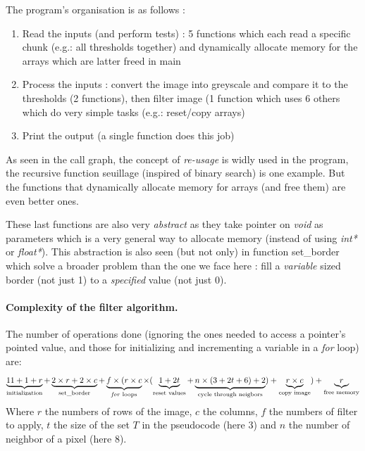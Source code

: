 \documentclass[a4paper]{report} %
\begin{document}
\SetEndCharOfAlgoLine{}

The program's organisation is as follows :
\begin{enumerate}
\item Read the inputs (and perform tests) : 5 functions which each read a specific chunk (e.g.: all thresholds together) and dynamically allocate memory for the arrays which are latter freed in main

\item Process the inputs : convert the image into greyscale and compare it to the thresholds (2 functions), then filter image
(1 function which uses 6 others which do very simple tasks (e.g.: reset/copy arrays)

\item Print the output (a single function does this job)
\end{enumerate}

As seen in the call graph, the concept of \emph{re-usage} is widly used in the program, 
the recursive function seuillage (inspired of binary search) is one example.
But the functions that dynamically allocate memory for arrays (and free them) are even better ones.

These last functions are also very \emph{abstract} as they take pointer on \emph{void} as parameters which is a very general way to allocate memory (instead of using \emph{int*} or \emph{float*}).
This abstraction is also seen  (but not only) in function set\_border which solve a broader problem than the one we face here : fill a \emph{variable} sized border (not just 1) to a \emph{specified} value (not just 0).

\paragraph{Complexity of the filter algorithm.} The number of operations done (ignoring the ones needed to access a pointer's pointed value, and those for initializing and incrementing a variable in a \emph{for} loop) are:
\[
\underbrace{11 + 1 + r }_{\text{initialization}}
+
\underbrace{2 \times r + 2 \times c }_{\text{set\_border}} 
+
\underbrace{ f \times ( r \times c }_{\text{\emph{for} loops}}
\times ( 
\underbrace{1+2t}_{\text{reset values}}
+ 
\underbrace{n \times (3 + 2t + 6) + 2}_{\text{cycle through neigbors}}
) + 
\underbrace{ r \times c }_{\text{copy image}}
)+ 
\underbrace{ r }_{\text{free memory}}
\]
Where $r$ the numbers of rows of the image, $c$ the columns, $f$ the numbers of filter to apply, $t$ the size of the set $T$ in the pseudocode (here $3$) and $n$ the number of neighbor of a pixel (here $8$).
\end{document}
